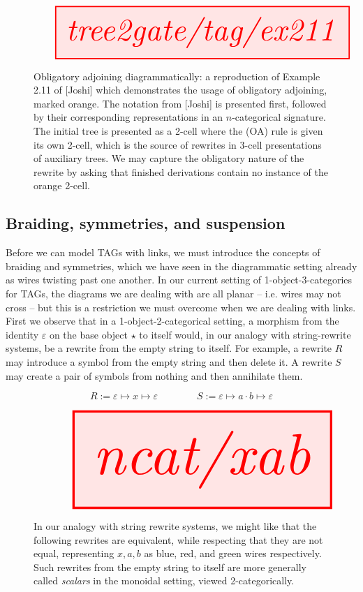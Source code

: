 \begin{figure}[h!]
\centering
\[\resizebox{\textwidth}{!}{\tikzfig{tree2gate/tag/ex211}}\]
\caption{
Obligatory adjoining diagrammatically: a reproduction of Example 2.11 of [Joshi] which demonstrates the usage of obligatory adjoining, marked orange. The notation from [Joshi] is presented first, followed by their corresponding representations in an $n$-categorical signature. The initial tree is presented as a 2-cell where the (OA) rule is given its own 2-cell, which is the source of rewrites in 3-cell presentations of auxiliary trees. We may capture the obligatory nature of the rewrite by asking that finished derivations contain no instance of the orange 2-cell.
}
\end{figure}



\subsection{Braiding, symmetries, and suspension}

Before we can model TAGs with links, we must introduce the concepts of braiding and symmetries, which we have seen in the diagrammatic setting already as wires twisting past one another. In our current setting of 1-object-3-categories for TAGs, the diagrams we are dealing with are all planar -- i.e. wires may not cross -- but this is a restriction we must overcome when we are dealing with links.\\

First we observe that in a 1-object-2-categorical setting, a morphism from the identity $\varepsilon$ on the base object $\star$ to itself would, in our analogy with string-rewrite systems, be a rewrite from the empty string to itself. For example, a rewrite $R$ may introduce a symbol from the empty string and then delete it. A rewrite $S$ may create a pair of symbols from nothing and then annihilate them.

\[R := \varepsilon \mapsto x \mapsto \varepsilon \quad\quad\quad\quad S := \varepsilon \mapsto a \cdot b \mapsto \varepsilon\]

\begin{figure}[h!]
\centering
\[\resizebox{\textwidth}{!}{\tikzfig{ncat/xab}}\]
\caption{
In our analogy with string rewrite systems, we might like that the following rewrites are equivalent, while respecting that they are not equal, representing $x,a,b$ as blue, red, and green wires respectively. Such rewrites from the empty string to itself are more generally called \emph{scalars} in the monoidal setting, viewed 2-categorically.
}
\end{figure}

